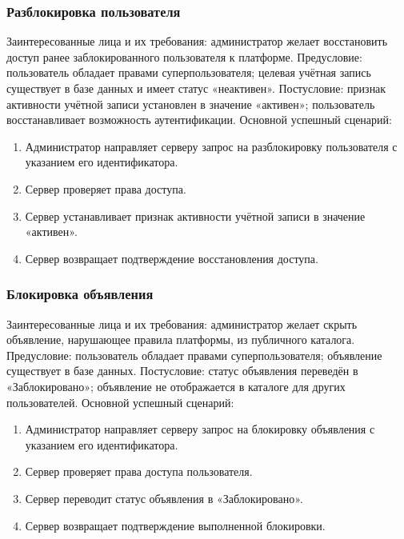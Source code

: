 \subsubsection{Разблокировка пользователя}
Заинтересованные лица и их требования: администратор желает восстановить доступ ранее заблокированного пользователя к платформе.
Предусловие: пользователь обладает правами суперпользователя; целевая учётная запись существует в базе данных и имеет статус «неактивен».
Постусловие: признак активности учётной записи установлен в значение «активен»; пользователь восстанавливает возможность аутентификации.
Основной успешный сценарий:
\begin{enumerate}
\item Администратор направляет серверу запрос на разблокировку пользователя с указанием его идентификатора.
\item Сервер проверяет права доступа.
\item Сервер устанавливает признак активности учётной записи в значение «активен».
\item Сервер возвращает подтверждение восстановления доступа.
\end{enumerate}

\subsubsection{Блокировка объявления}
Заинтересованные лица и их требования: администратор желает скрыть объявление, нарушающее правила платформы, из публичного каталога.
Предусловие: пользователь обладает правами суперпользователя; объявление существует в базе данных.
Постусловие: статус объявления переведён в «Заблокировано»; объявление не отображается в каталоге для других пользователей.
Основной успешный сценарий:
\begin{enumerate}
\item Администратор направляет серверу запрос на блокировку объявления с указанием его идентификатора.
\item Сервер проверяет права доступа пользователя.
\item Сервер переводит статус объявления в «Заблокировано».
\item Сервер возвращает подтверждение выполненной блокировки.
\end{enumerate}

